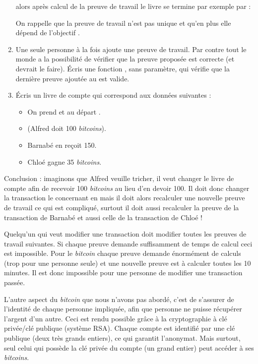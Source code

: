 \documentclass[11pt,class=report,crop=false]{standalone}
\begin{document}
\begin{activite}
\begin{enumerate}
  \centerline{}
  
  alors après calcul de la preuve de travail le livre se termine par exemple par :
  
  \centerline{}  
  
     On rappelle que la preuve de travail n'est pas unique et qu'en plus elle dépend 
   de l'objectif .
   
   \item Une seule personne à la fois ajoute une preuve de travail. Par contre tout le monde a la possibilité de vérifier que la preuve proposée est correcte (et devrait le faire). 
	Écris une fonction , sans paramètre, qui vérifie que la dernière preuve ajoutée au  est valide.
	
	\item Écris un livre de compte qui correspond aux données suivantes :
	\begin{itemize}
	  \item On prend  et au départ .
	  \item {} (Alfred doit 100 \emph{bitcoins}).
	  \item Barnabé en reçoit 150.
	  \item Chloé gagne 35 \emph{bitcoins}.
	\end{itemize}

\end{enumerate} 

Conclusion : imaginons que Alfred veuille tricher, il veut changer le livre de compte afin de recevoir 100 \emph{bitcoins} au lieu d'en devoir 100. Il doit donc changer la transaction le concernant en  mais il doit alors recalculer une nouvelle preuve de travail ce qui est compliqué, surtout il doit aussi recalculer la preuve de la transaction de Barnabé et aussi celle de la transaction de Chloé ! 

Quelqu'un qui veut modifier une transaction doit modifier toutes les preuves de travail suivantes. Si chaque preuve demande suffisamment de temps de calcul ceci est impossible. Pour le \emph{bitcoin} chaque preuve demande énormément de calculs (trop pour une personne seule) et une nouvelle preuve est à calculer toutes les 10 minutes. Il est donc impossible pour une personne de modifier une transaction passée.

\end{activite}


L'autre aspect du \emph{bitcoin} que nous n'avons pas abordé, c'est de s'assurer de l'identité de chaque personne impliquée, afin que personne ne puisse récupérer l'argent d'un autre. Ceci est rendu possible grâce à la cryptographie à clé privée/clé publique (système RSA). Chaque compte est identifié par une clé publique (deux très grands entiers), ce qui garantit l'anonymat. Mais surtout, seul celui qui possède la clé privée du compte (un grand entier) peut accéder à ses \emph{bitcoins}.
\end{document}
